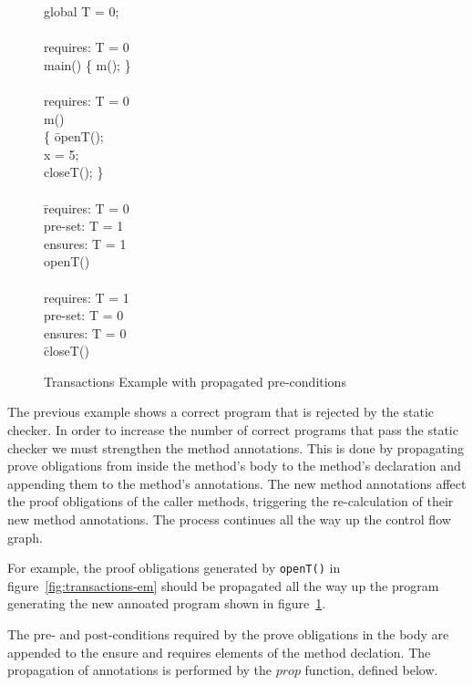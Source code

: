\documentclass[10pt,notitlepage,twoside]{article}
\begin{document}
\begin{figure}[tbp]
\ttfamily
\begin{tabbing}
global T = 0; \\
\ \\
requires: T = 0 \\
main() \{ m(); \} \\
\ \\
requires: T = 0 \\
m() \\
\{ \=openT(); \\
\> x = 5; \\
\> closeT(); \} \\
\ \\
\= requires: T = 0  \\
pre-set: T = 1 \\
ensures: T = 1 \\
openT()  \\
\ \\
requires: T = 1  \\
pre-set: T = 0 \\
ensures: T = 0 \\
\=closeT()
\end{tabbing}
\caption{Transactions Example with  propagated pre-conditions}\label{fig:transactions-pre}
\end{figure}

The previous example shows a correct program that is rejected by the static checker.
In order to increase the number of correct programs that pass the static checker we must strengthen the method annotations. This is done by propagating prove obligations from inside the method's body to the method's declaration and appending them to the method's annotations. The new method annotations affect the proof obligations of the caller methods, triggering the re-calculation of their new method annotations. The process continues all the way up the control flow graph.

For example, the proof obligations generated by \texttt{openT()} in figure~\ref{fig:transactions-em} should be propagated all the way up the program generating the new annoated program shown in figure~\ref{fig:transactions-pre}.



The pre- and post-conditions required by the prove obligations in the body are appended to the ensure and requires elements of the method declation.
The propagation of annotations is performed  by the $\mathit{prop}$ function, defined below.
\end{document}
